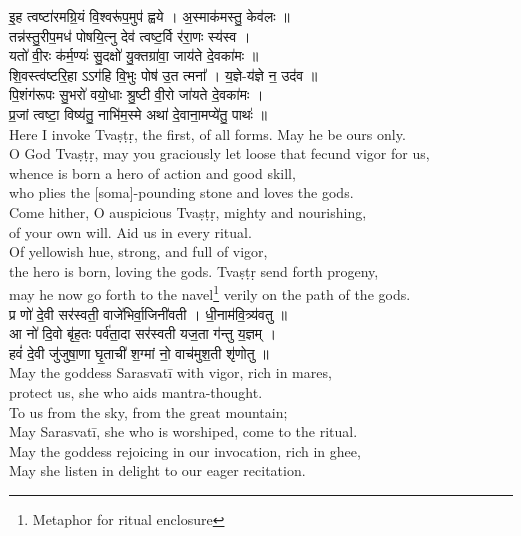 \documentclass[11pt]{article}
\begin{document}
\begin{adjustwidth}{6em}{.2em}
{\large\skts\color{deepblue}
इ॒ह त्वष्टा॑रमग्रि॒यं वि॒श्वरू॑प॒मुप॑ ह्वये । अ॒स्माक॑मस्तु॒ केव॑लः ॥\\ 
तन्न॑स्तु॒रीप॒मध॑ पोषयि॒त्नु देव॑ त्वष्ट॒र्वि र॑रा॒णः स्य॑स्व ।\\
यतो॑ वी॒रः क॑र्म॒ण्यः॑ सु॒दक्षो॑ यु॒क्तग्रा॑वा॒ जाय॑ते दे॒वका॑मः ॥\\
शि॒वस्त्व॑ष्टरि॒हा ऽऽग॑हि वि॒भुः पोष॑ उ॒त त्मना᳚ । य॒ज्ञे-य॑ज्ञे न॒ उद॑व ॥\\
पि॒शंग॑रूपः सु॒भरो॑ वयो॒धाः श्रु॒ष्टी वी॒रो जा॑यते दे॒वका॑मः ।\\
प्र॒जां त्वष्टा॒ विष्य॑तु॒ नाभि॑म॒स्मे अथा॑ दे॒वाना॒मप्ये॑तु॒ पाथः॑ ॥}\\[5pt]
Here I invoke Tvaṣṭṛ, the first, of all forms. May he be ours only.\\
O God Tvaṣṭṛ, may you graciously let loose that fecund vigor for us,\\
whence is born a hero of action and good skill,\\
who plies the [soma]-pounding stone and loves the gods.\\
Come hither, O auspicious Tvaṣṭṛ, mighty and nourishing,\\
of your own will. Aid us in every ritual.\\
Of yellowish hue, strong, and full of vigor,\\ 
the hero is born, loving the gods. Tvaṣṭṛ send forth progeny,\\
may he now go forth to the navel\footnote{Metaphor for ritual enclosure} verily on the path of the gods.\\[10pt]

{\large\skts\color{deepblue}
प्र णो॑ दे॒वी सर॑स्वती॒ वाजे॑भिर्वा॒जिनी॑वती । धी॒नाम॑वि॒त्र्य॑वतु ॥\\
आ नो॑ दि॒वो बृ॑ह॒तः पर्व॑ता॒दा सर॑स्वती यज॒ता ग॑न्तु य॒ज्ञम् ।\\
हवं॑ दे॒वी जु॑जुषा॒णा घृ॒ताची॑ श॒ग्मां नो॒ वाच॑मुश॒ती श‍ृ॑णोतु ॥}\\[5pt]
May the goddess Sarasvatī with vigor, rich in mares,\\
protect us, she who aids mantra-thought.\\
To us from the sky, from the great mountain;\\
May Sarasvatī, she who is worshiped, come to the ritual.\\
May the goddess rejoicing in our invocation, rich in ghee,\\
May she listen in delight to our eager recitation.\\[10pt]


\end{adjustwidth}
\end{document}
